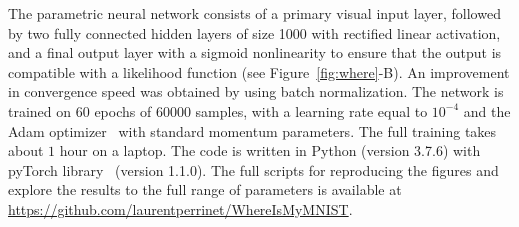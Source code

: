 The parametric neural network consists of a primary visual input layer, followed by two fully connected hidden layers of size 1000  with rectified linear activation, and a final output layer with a sigmoid nonlinearity to ensure that the output is compatible with a likelihood function (see Figure~\ref{fig:where}-B). An improvement in convergence speed was obtained by using batch normalization. The network is trained on $60$ epochs of $60000$ samples, with a learning rate equal to $10^{-4}$ and the Adam optimizer~\cite{kingma2014adam} with standard momentum parameters. The full training takes about $1$ hour on a laptop. The code is written in Python (version 3.7.6) with pyTorch library~\cite{NEURIPS2019_9015} (version 1.1.0). The full scripts for reproducing the figures and explore the results to the full range of parameters is available at \url{https://github.com/laurentperrinet/WhereIsMyMNIST}. %

